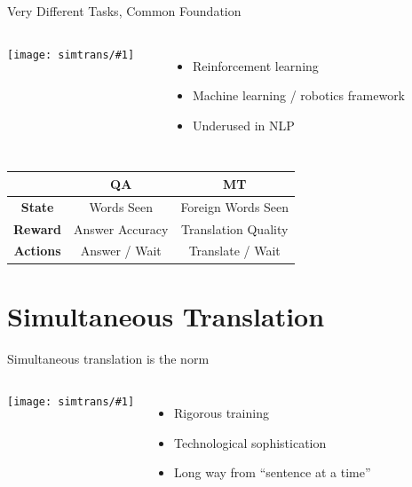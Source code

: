 \documentclass[compress]{beamer}
\newcommand{\gfxs}[2]{
\begin{center}
	\texttt{[image: simtrans/\#1]}
\end{center}
}
\begin{document}
\begin{frame}{Very Different Tasks, Common Foundation}

\begin{columns}
  \gfxs{pancake_robot}{.4}
  \begin{center}
  \end{center}
  
  \begin{itemize}
    \item Reinforcement learning
    \item Machine learning / robotics framework
    \item Underused in NLP
  \end{itemize}
\end{columns}

\vspace{-.5cm}

  \begin{center}
\begin{tabular}{ccc}
\hline
  & QA & MT \\
\hline
{\bf State} & Words Seen & Foreign Words Seen \\
{\bf Reward} & Answer Accuracy & Translation Quality \\
{\bf Actions} & Answer / Wait & Translate / Wait \\
\hline
\end{tabular}

  \end{center}

\end{frame}

\section{Simultaneous Translation}

\begin{frame}{Simultaneous translation is the norm}

  \begin{columns}
       \gfxs{nuremberg_translators}{.9}
       \begin{itemize}
         \item Rigorous training
         \item Technological sophistication
         \item Long way from ``sentence at a time''
       \end{itemize}
  \end{columns}

\end{frame}
\end{document}
